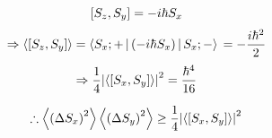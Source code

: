 \begin{enumerate}[labelindent = 0pt, label = (\roman*)]
	\vspace{10pt}

	\[
		\left[ S_z, S_y \right]
		= -i\hbar S_x
	\]
	\[
		\Rightarrow
		\Braket{\left[ S_z, S_y \right]}
		= \Braket{S_x; + | \left( -i\hbar S_x \right) | S_x; -} \\
		= -\frac{i\hbar^2}{2}
	\]
	\[
		\Rightarrow
		\frac{1}{4} {\left| \Braket{\left[ S_x, S_y \right]} \right|}^2
		= \frac{\hbar^4}{16}
	\]

	\[
		\therefore
		\Braket{{\left( \Delta S_x \right)}^2} \Braket{{\left( \Delta S_y \right)}^2}
		\geq \frac{1}{4} {\left| \Braket{\left[ S_x, S_y \right]} \right|}^2
	\]

\end{enumerate}